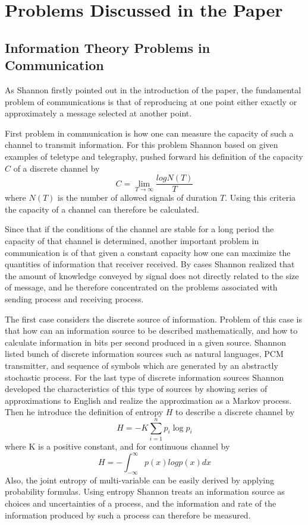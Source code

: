 \documentclass[12pt]{article}
\begin{document}
		\section{Problems Discussed in the Paper}
		\subsection{Information Theory Problems in Communication}
		As Shannon firstly pointed out in the introduction of the paper, the fundamental problem of communications is that of reproducing at one point either exactly or approximately a message selected at another point. \par
		First problem in communication is how one can measure the capacity of such a channel to transmit information. For this problem Shannon based on given examples of teletype and telegraphy, pushed forward his definition of the capacity $C$ of a discrete channel by $$C = \lim_{T\to\infty} \frac{logN(T)}{T}$$ where $N(T)$ is the number of allowed signals of duration $T$. Using this criteria the capacity of a channel can therefore be calculated. \par 
		Since that if the conditions of the channel are stable for a long period the capacity of that channel is determined, another important problem in communication is of that given a constant capacity how one can maximize the quantities of information that receiver received. By cases Shannon realized that the amount of knowledge conveyed by signal does not directly related to the size of message, and he therefore concentrated on the problems associated with sending process and receiving process. \par  
		The first case considers the discrete source of information. Problem of this case is that how can an information source to be described mathematically, and how to calculate information in bits per second produced in a given source. Shannon listed bunch of discrete information sources such as natural languages, PCM transmitter, and sequence of symbols which are generated by an abstractly stochastic process. For the last type of discrete information sources Shannon developed the characteristics of this type of sources by showing series of approximations to English and realize the approximation as a Markov process. Then he introduce the definition of entropy $H$ to describe a discrete channel by $$ H = -K\sum_{i=1}^{n} p_i\log{p_i} $$ where K is a positive constant, and for continuous channel by $$ H = -\int_{-\infty}^{\infty}p(x)logp(x)dx$$ Also, the joint entropy of multi-variable can be easily derived by applying probability formulas. Using entropy Shannon treats an information source as choices and uncertainties of a process, and the information and rate of the information produced by such a process can therefore be measured. \par 
\end{document}
